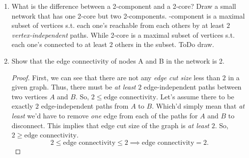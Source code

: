 \documentclass[12pt,a4paper,oneside,draft]{article}
\begin{document}
\begin{enumerate}
\begin{itemize}
      connected, planar network is strictly less than \textit{six}.
      \newline
      \begin{proof}
        By Handshaking lemma, we know that mean degree is
          $$c = \frac{1}{|V|} * \sum_{v \in V} deg(v) = \frac{2 * |E|}{|V|} = \frac{2 * m}{n},$$
        and we proved $n - m + f = 2$ in (iv).
        \newline
        Similar to Handshaking lemma, we know for sum of degress of all faces:
          $$\sum_{i} deg(f_i) = 2 * |E| = 2 * m.$$
        From there, because our graphs are all simple, the smallest possible degree of a face
        would be $3$, so:
          $$\sum_{i} 3 \leq \sum_{i} deg(f_i) \implies 3 * f \leq 2 * m.$$
        Thus, by solving for $f$ in $n - m + f = 2 \implies f = 2 + m - n$ we get:
          $$3 * f \leq 2 * m \implies 3 * (2 + m - n) \leq 2 * m \implies m \leq 3*n - 6.$$
        Further, by substituting the above to the equation for mean degree $c$:
          $$c = \frac{2 * m}{n} \leq \frac{2*(3*n - 6)}{n} \implies c \leq 6 - \frac{12}{n}.$$
        Which for all $n \neq 0$ it's true that $c < 6.$
      \end{proof}
    \end{itemize}
    \item
      What is the difference between a 2-component and a 2-core?
      Draw a small network that has one 2-core but two 2-components.
      \newline
      -component is a maximal subset of vertices s.t. each one's reachable from each others
      by at least $2$ \textit{vertex-independent} paths.
      \newline
      While 2-core is a maximal subset of vertices s.t. each one's connected to at least
      $2$ others in the subset.
      \newline
      ToDo draw.
    \item
      Show that the edge connectivity of nodes A and B in the network is 2.
      \begin{proof}
        First, we can see that there are not any \textit{edge cut size} less than $2$ in a given graph.
        Thus, there must be \textit{at least} $2$ edge-independent paths between two vertices $A$ and $B$.
        So, $2 \leq \text{edge connectivity}$.
        \newline
        Let's assume there to be exactly $2$ edge-independent paths from $A$ to $B$. Which'd simply mean
        that \textit{at least} we'd have to remove \textit{one} edge from each of the paths for $A$ and $B$
        to disconnect. This implies that edge cut size of the graph is \textit{at least} $2$.
        So, $2 \geq \text{edge connectivity}$.
          $$2 \leq \text{edge connectivity} \leq 2 \implies \text{edge connectivity} = 2.$$
      \end{proof}
\end{enumerate}
\end{document}
